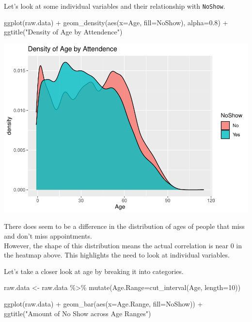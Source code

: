 \documentclass[
]{article}
\newenvironment{Shaded}{\begin{snugshade}}{\end{snugshade}}
\newcommand{\AttributeTok}[1]{\textcolor[rgb]{0.77,0.63,0.00}{#1}}
\newcommand{\DecValTok}[1]{\textcolor[rgb]{0.00,0.00,0.81}{#1}}
\newcommand{\FloatTok}[1]{\textcolor[rgb]{0.00,0.00,0.81}{#1}}
\newcommand{\FunctionTok}[1]{\textcolor[rgb]{0.00,0.00,0.00}{#1}}
\newcommand{\NormalTok}[1]{#1}
\newcommand{\OtherTok}[1]{\textcolor[rgb]{0.56,0.35,0.01}{#1}}
\newcommand{\SpecialCharTok}[1]{\textcolor[rgb]{0.00,0.00,0.00}{#1}}
\newcommand{\StringTok}[1]{\textcolor[rgb]{0.31,0.60,0.02}{#1}}
\begin{document}
Let's look at some individual variables and their relationship with
\texttt{NoShow}.

\begin{Shaded}
\begin{Highlighting}[]
\FunctionTok{ggplot}\NormalTok{(raw.data) }\SpecialCharTok{+} 
  \FunctionTok{geom\_density}\NormalTok{(}\FunctionTok{aes}\NormalTok{(}\AttributeTok{x=}\NormalTok{Age, }\AttributeTok{fill=}\NormalTok{NoShow), }\AttributeTok{alpha=}\FloatTok{0.8}\NormalTok{) }\SpecialCharTok{+} 
  \FunctionTok{ggtitle}\NormalTok{(}\StringTok{"Density of Age by Attendence"}\NormalTok{)}
\end{Highlighting}
\end{Shaded}

\begin{center}\includegraphics{lab1_medical_databases_files/figure-latex/unnamed-chunk-6-1} \end{center}

There does seem to be a difference in the distribution of ages of people
that miss and don't miss appointments.\\
However, the shape of this distribution means the actual correlation is
near 0 in the heatmap above. This highlights the need to look at
individual variables.

Let's take a closer look at age by breaking it into categories.

\begin{Shaded}
\begin{Highlighting}[]
\NormalTok{raw.data }\OtherTok{\textless{}{-}}\NormalTok{ raw.data }\SpecialCharTok{\%\textgreater{}\%} \FunctionTok{mutate}\NormalTok{(}\AttributeTok{Age.Range=}\FunctionTok{cut\_interval}\NormalTok{(Age, }\AttributeTok{length=}\DecValTok{10}\NormalTok{))}

\FunctionTok{ggplot}\NormalTok{(raw.data) }\SpecialCharTok{+} 
  \FunctionTok{geom\_bar}\NormalTok{(}\FunctionTok{aes}\NormalTok{(}\AttributeTok{x=}\NormalTok{Age.Range, }\AttributeTok{fill=}\NormalTok{NoShow)) }\SpecialCharTok{+} 
  \FunctionTok{ggtitle}\NormalTok{(}\StringTok{"Amount of No Show across Age Ranges"}\NormalTok{)}
\end{Highlighting}
\end{Shaded}
\end{document}
